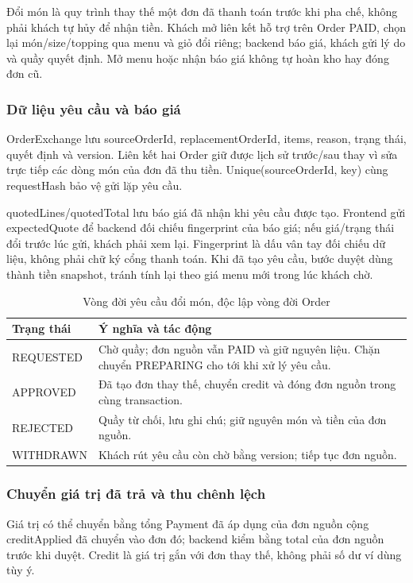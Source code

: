 \label{sec:exchange-design}
Đổi món là quy trình thay thế một đơn đã thanh toán trước khi pha chế, không phải khách tự hủy để nhận tiền. Khách mở liên kết hỗ trợ trên Order PAID, chọn lại món/size/topping qua menu và giỏ đổi riêng; backend báo giá, khách gửi lý do và quầy quyết định. Mở menu hoặc nhận báo giá không tự hoàn kho hay đóng đơn cũ.

\subsubsection{Dữ liệu yêu cầu và báo giá}
OrderExchange lưu sourceOrderId, replacementOrderId, items, reason, trạng thái, quyết định và version. Liên kết hai Order giữ được lịch sử trước/sau thay vì sửa trực tiếp các dòng món của đơn đã thu tiền. Unique(sourceOrderId, key) cùng requestHash bảo vệ gửi lặp yêu cầu.

quotedLines/quotedTotal lưu báo giá đã nhận khi yêu cầu được tạo. Frontend gửi expectedQuote để backend đối chiếu fingerprint của báo giá; nếu giá/trạng thái đổi trước lúc gửi, khách phải xem lại. Fingerprint là dấu vân tay đối chiếu dữ liệu, không phải chữ ký cổng thanh toán. Khi đã tạo yêu cầu, bước duyệt dùng thành tiền snapshot, tránh tính lại theo giá menu mới trong lúc khách chờ.

\begin{table}[htbp]\centering\small
\begin{tabularx}{\linewidth}{|p{.24\linewidth}|X|}\hline
\textbf{Trạng thái} & \textbf{Ý nghĩa và tác động}\\\hline
REQUESTED & Chờ quầy; đơn nguồn vẫn PAID và giữ nguyên liệu. Chặn chuyển PREPARING cho tới khi xử lý yêu cầu.\\\hline
APPROVED & Đã tạo đơn thay thế, chuyển credit và đóng đơn nguồn trong cùng transaction.\\\hline
REJECTED & Quầy từ chối, lưu ghi chú; giữ nguyên món và tiền của đơn nguồn.\\\hline
WITHDRAWN & Khách rút yêu cầu còn chờ bằng version; tiếp tục đơn nguồn.\\\hline
\end{tabularx}\caption{Vòng đời yêu cầu đổi món, độc lập vòng đời Order}
\end{table}

\subsubsection{Chuyển giá trị đã trả và thu chênh lệch}
Giá trị có thể chuyển bằng tổng Payment đã áp dụng của đơn nguồn cộng creditApplied đã chuyển vào đơn đó; backend kiểm bằng total của đơn nguồn trước khi duyệt. Credit là giá trị gắn với đơn thay thế, không phải số dư ví dùng tùy ý.


